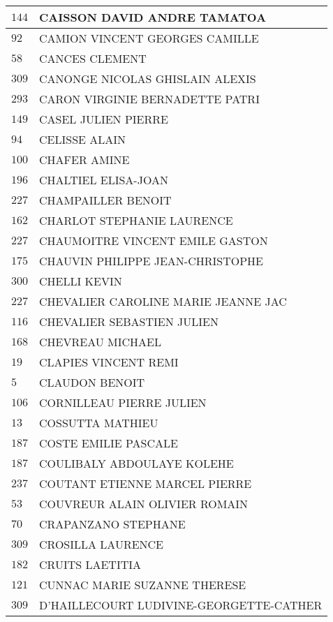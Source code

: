 \begin{xltabular}{\linewidth}{|l|X|}
    \hline
    $144$ & CAISSON DAVID ANDRE TAMATOA \\
    \hline
    $92$ & CAMION VINCENT GEORGES CAMILLE \\
    \hline
    $58$ & CANCES CLEMENT \\
    \hline
    $309$ & CANONGE NICOLAS GHISLAIN ALEXIS \\
    \hline
    $293$ & CARON VIRGINIE BERNADETTE PATRI \\
    \hline
    $149$ & CASEL JULIEN PIERRE \\
    \hline
    $94$ & CELISSE ALAIN \\
    \hline
    $100$ & CHAFER AMINE \\
    \hline
    $196$ & CHALTIEL ELISA-JOAN \\
    \hline
    $227$ & CHAMPAILLER BENOIT \\
    \hline
    $162$ & CHARLOT STEPHANIE LAURENCE \\
    \hline
    $227$ & CHAUMOITRE VINCENT EMILE GASTON \\
    \hline
    $175$ & CHAUVIN PHILIPPE JEAN-CHRISTOPHE \\
    \hline
    $300$ & CHELLI KEVIN \\
    \hline
    $227$ & CHEVALIER CAROLINE MARIE JEANNE JAC \\
    \hline
    $116$ & CHEVALIER SEBASTIEN JULIEN \\
    \hline
    $168$ & CHEVREAU MICHAEL \\
    \hline
    $19$ & CLAPIES VINCENT REMI \\
    \hline
    $5$ & CLAUDON BENOIT \\
    \hline
    $106$ & CORNILLEAU PIERRE JULIEN \\
    \hline
    $13$ & COSSUTTA MATHIEU \\
    \hline
    $187$ & COSTE EMILIE PASCALE \\
    \hline
    $187$ & COULIBALY ABDOULAYE KOLEHE \\
    \hline
    $237$ & COUTANT ETIENNE MARCEL PIERRE \\
    \hline
    $53$ & COUVREUR ALAIN OLIVIER ROMAIN \\
    \hline
    $70$ & CRAPANZANO STEPHANE \\
    \hline
    $309$ & CROSILLA LAURENCE \\
    \hline
    $182$ & CRUITS LAETITIA \\
    \hline
    $121$ & CUNNAC MARIE SUZANNE THERESE \\
    \hline
    $309$ & D'HAILLECOURT LUDIVINE-GEORGETTE-CATHER \\

\end{xltabular}
